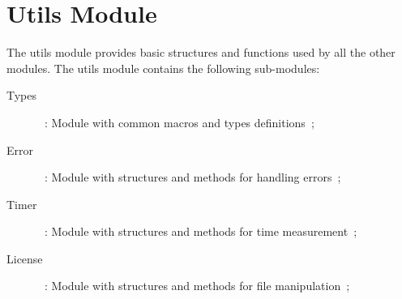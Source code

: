 \chapter{Utils Module}
\label{cha:utils}

The utils module provides basic structures and functions used by all the other modules. The utils module contains the following sub-modules:

\begin{description}
  \item[Types]~: Module with common macros and types definitions~;
  \item[Error]~: Module with structures and methods for handling errors~;  
  \item[Timer]~: Module with structures and methods for time measurement~;  
  \item[License]~: Module with structures and methods for file manipulation~;

\end{description}





